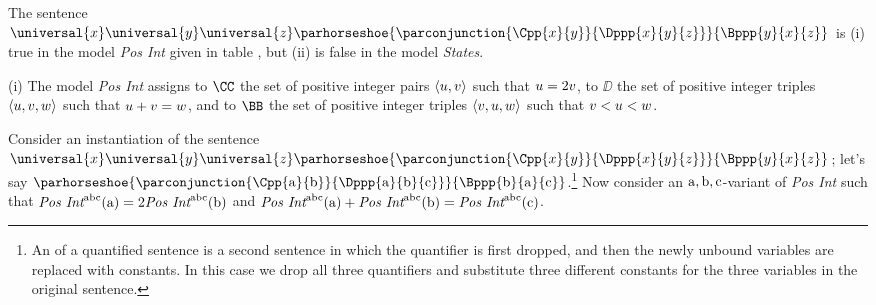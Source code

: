\begin{majorILnc}{}
The sentence $\universal{\variable{x}}\universal{\variable{y}}\universal{\variable{z}}\parhorseshoe{\parconjunction{\Cpp{\variable{x}}{\variable{y}}}{\Dppp{\variable{x}}{\variable{y}}{\variable{z}}}}{\Bppp{\variable{y}}{\variable{x}}{\variable{z}}}$ is (i) true in the model \emph{Pos Int} given in table , but (ii) is false in the model \emph{States}. 
\end{majorILnc}
\begin{PROOF}
(i) The model \emph{Pos Int} assigns to $\CC$ the set of positive integer pairs $\langle u,v\rangle$ such that $u=2v$, to $\DD$ the set of positive integer triples $\langle u,v,w\rangle$ such that $u+v=w$, and to $\BB$ the set of positive integer triples $\langle v,u,w\rangle$ such that $v<u<w$.  

Consider an instantiation of the sentence $\universal{\variable{x}}\universal{\variable{y}}\universal{\variable{z}}\parhorseshoe{\parconjunction{\Cpp{\variable{x}}{\variable{y}}}{\Dppp{\variable{x}}{\variable{y}}{\variable{z}}}}{\Bppp{\variable{y}}{\variable{x}}{\variable{z}}}$; let's say $\parhorseshoe{\parconjunction{\Cpp{\constant{a}}{\constant{b}}}{\Dppp{\constant{a}}{\constant{b}}{\constant{c}}}}{\Bppp{\constant{b}}{\constant{a}}{\constant{c}}}$.\footnote{An  of a quantified sentence is a second sentence in which the quantifier is first dropped, and then the newly unbound variables are replaced with constants.  In this case we drop all three quantifiers and substitute three different constants for the three variables in the original sentence.}  Now consider an $\mathrm{a},\mathrm{b},\mathrm{c}$-variant of \emph{Pos Int} such that $\emph{Pos Int}^{\mathrm{a}\mathrm{b}\mathrm{c}}(\mathrm{a})=2\emph{Pos Int}^{\mathrm{a}\mathrm{b}\mathrm{c}}(\mathrm{b})$ and $\emph{Pos Int}^{\mathrm{a}\mathrm{b}\mathrm{c}}(\mathrm{a})+\emph{Pos Int}^{\mathrm{a}\mathrm{b}\mathrm{c}}(\mathrm{b})=\emph{Pos Int}^{\mathrm{a}\mathrm{b}\mathrm{c}}(\mathrm{c})$.


\end{PROOF}
